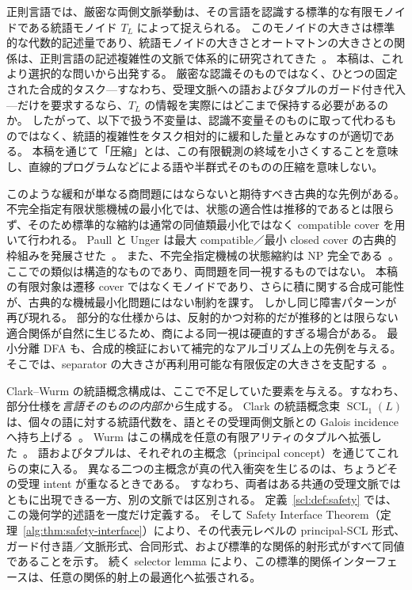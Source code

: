 \documentclass[10pt,a4paper]{ltjsarticle}
\theoremstyle{definition}
\theoremstyle{remark}
\newcommand{\SCL}{\operatorname{SCL}}
\begin{document}
正則言語では、厳密な両側文脈挙動は、その言語を認識する標準的な有限モノイドである統語モノイド $T_L$ によって捉えられる。
このモノイドの大きさは標準的な代数的記述量であり、統語モノイドの大きさとオートマトンの大きさとの関係は、正則言語の記述複雑性の文脈で体系的に研究されてきた~\cite{HolzerKonig2004}。
本稿は、これより選択的な問いから出発する。
厳密な認識そのものではなく、ひとつの固定された合成的タスク---すなわち、受理文脈への語およびタプルのガード付き代入---だけを要求するなら、$T_L$ の情報を実際にはどこまで保持する必要があるのか。
したがって、以下で扱う不変量は、認識不変量そのものに取って代わるものではなく、統語的複雑性をタスク相対的に緩和した量とみなすのが適切である。
本稿を通じて「圧縮」とは、この有限観測の終域を小さくすることを意味し、直線的プログラムなどによる語や半群式そのものの圧縮を意味しない。

このような緩和が単なる商問題にはならないと期待すべき古典的な先例がある。
不完全指定有限状態機械の最小化では、状態の適合性は推移的であるとは限らず、そのため標準的な縮約は通常の同値類最小化ではなく compatible cover を用いて行われる。
Paull と Unger は最大 compatible／最小 closed cover の古典的枠組みを発展させた~\cite{PaullUnger1959}。
また、不完全指定機械の状態縮約は NP 完全である~\cite{Pfleeger1973}。
ここでの類似は構造的なものであり、両問題を同一視するものではない。
本稿の有限対象は遷移 cover ではなくモノイドであり、さらに積に関する合成可能性が、古典的な機械最小化問題にはない制約を課す。
しかし同じ障害パターンが再び現れる。
部分的な仕様からは、反射的かつ対称的だが推移的とは限らない適合関係が自然に生じるため、商による同一視は硬直的すぎる場合がある。
最小分離 DFA も、合成的検証において補完的なアルゴリズム上の先例を与える。そこでは、separator の大きさが再利用可能な有限仮定の大きさを支配する~\cite{ChenFarzanClarkeTsayWang2009,VazquezPargaGarciaLopez2016}。

Clark--Wurm の統語概念構成は、ここで不足していた要素を与える。すなわち、部分仕様を\emph{言語そのものの内部から}生成する。
Clark の統語概念束 $\SCL_1(L)$ は、個々の語に対する統語代数を、語とその受理両側文脈との Galois incidence へ持ち上げる~\cite{ClarkSCL}。
Wurm はこの構成を任意の有限アリティのタプルへ拡張した~\cite{WurmSCLTuples}。
語およびタプルは、それぞれの主概念（principal concept）を通じてこれらの束に入る。
異なる二つの主概念が真の代入衝突を生じるのは、ちょうどその受理 intent が重なるときである。
すなわち、両者はある共通の受理文脈ではともに出現できる一方、別の文脈では区別される。
定義~\ref{scl:def:safety} では、この幾何学的述語を一度だけ定義する。
そして Safety Interface Theorem（定理~\ref{alg:thm:safety-interface}）により、その代表元レベルの principal-SCL 形式、ガード付き語／文脈形式、合同形式、および標準的な関係的射形式がすべて同値であることを示す。
続く selector lemma により、この標準的関係インターフェースは、任意の関係的射上の最適化へ拡張される。
\end{document}
